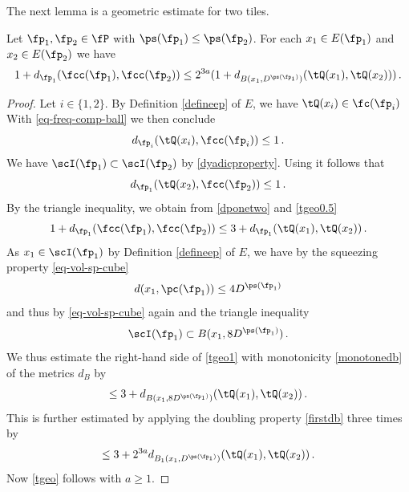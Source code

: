 The next lemma is a geometric estimate for two tiles.
\begin{lemma}\label{tile-uncertainty}
\leanok
{}
    Let $\fp_1, \fp_2\in \fP$ with
$\ps({\fp_1})\leq \ps({\fp_2})$. For each $x_1\in E(\fp_1)$ and
$x_2\in E(\fp_2)$ we have
\begin{equation}\label{tgeo}
  1+d_{\fp_1}(\fcc(\fp_1), \fcc(\fp_2))\le
    2^{3a}(1 + d_{B(x_1, D^{\ps(\fp_1)})}(\tQ(x_1),\tQ(x_2)))\, .
\end{equation}
\end{lemma}
\begin{proof}
Let $i\in \{1,2\}$.
By Definition \eqref{defineep} of $E$,
we have $\tQ(x_i)\in \fc(\fp_i)$
With \eqref{eq-freq-comp-ball} we then conclude
\begin{equation}\label{dponetwo}
    d_{\fp_i}(\tQ(x_i),\fcc(\fp_i))\le 1\, .
\end{equation}
We have $\scI(\fp_1)\subset \scI(\fp_2)$ by \eqref{dyadicproperty}. Using  it follows that
\begin{equation}\label{tgeo0.5}
    d_{\fp_1}(\tQ(x_2), \fcc(\fp_2)) \le 1\,.
\end{equation}
By the triangle inequality, we obtain from \eqref{dponetwo} and
\eqref{tgeo0.5}
\begin{equation}\label{tgeo1}
     1+d_{\fp_1}(\fcc(\fp_1), \fcc(\fp_2))\le 3 +d_{\fp_1}(\tQ(x_1), \tQ(x_2))\, .
\end{equation}
As $x_1\in \scI(\fp_1)$ by Definition \eqref{defineep} of $E$, we have by the squeezing property \eqref{eq-vol-sp-cube}
\begin{equation}
    d(x_1,\pc(\fp_1))\le 4D^{\ps(\fp_1)}
\end{equation}
and thus by \eqref{eq-vol-sp-cube} again and the triangle inequality
\begin{equation}
    \scI(\fp_1)\subset B(x_1,8D^{\ps(\fp_1)})\, .
\end{equation}
We thus estimate the right-hand side of \eqref{tgeo1} with monotonicity \eqref{monotonedb} of the metrics $d_B$ by
\begin{equation}\label{tgeo1.5}
    \le 3+d_{B(x_1,8D^{\ps(\fp_1)})}(\tQ(x_1), \tQ(x_2))\, .
\end{equation}
This is further estimated by applying the doubling property \eqref{firstdb} three times by
\begin{equation}\label{tgeo2}
    \le 3+2^{3a}d_{B_1(x_1, D^{\ps(\fp_1)})}(\tQ(x_1), \tQ(x_2))\, .
\end{equation}
Now \eqref{tgeo} follows with $a\ge 1$.
\end{proof}




